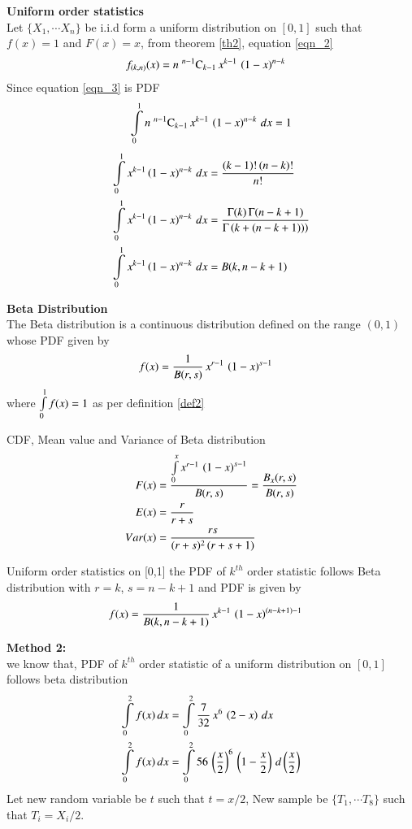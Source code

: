\documentclass[journal,12pt,twocolumn]{IEEEtran}
\begin{document}
\begin{definition}
\textbf{Uniform order statistics} \\
Let $\{X_1,\cdots X_n\}$ be i.i.d form a uniform distribution on $[0,1]$ such that $f(x) = 1$ and $F(x)=x$,
from theorem \eqref{th2}, equation \eqref{eqn_2}
\begin{align}
f_{(k,n)}(x) &= n\;{}^{n-1}\mathrm{C}_{k-1}\,x^{k-1}\,\left(1-x\right)^{n-k}\label{eqn_3}
\end{align}
Since equation \eqref{eqn_3} is PDF 
\begin{equation}
 \int\limits_{0}^{1} n\;{}^{n-1}\mathrm{C}_{k-1}\,x^{k-1}\,\left(1-x\right)^{n-k} \,dx  = 1    
\end{equation}
\begin{align}
\int\limits_{0}^{1} x^{k-1}\left(1-x\right)^{n-k} \,dx  &= \dfrac{(k-1)!\,(n-k)!}{n!}  \\
\int\limits_{0}^{1} x^{k-1}\left(1-x\right)^{n-k} \,dx  &= \dfrac{\Gamma(k)\,\Gamma(n-k+1)}{\Gamma\left(k+(n-k+1))\right)} \\
\int\limits_{0}^{1} x^{k-1}\left(1-x\right)^{n-k} \,dx  &= B(k,n-k+1)
\end{align}
\end{definition}
\newpage
\begin{definition}
\label{bddef}
\textbf{Beta Distribution} \\
The Beta distribution is a continuous distribution defined on the range $(0,1)$ whose PDF given by 
\begin{align}
f(x) &= \dfrac{1}{B(r,s)}\,x^{r-1}\,\left(1-x\right)^{s-1} 
\end{align}
where $\int\limits_{0}^1f(x) = 1$ as per definition \eqref{def2} 

CDF, Mean value and Variance of Beta distribution
\begin{align}
 F(x)   &=\dfrac{\int\limits_{0}^{x}x^{r-1}\,\left(1-x\right)^{s-1}}{B(r,s)} =    \dfrac{B_{x}(r,s)}{B(r,s)} \\
 E(x)   &=   \dfrac{r}{r+s} \\
 Var(x) &= \dfrac{rs}{(r+s)^{2}\,(r+s+1)}
\end{align}
\end{definition}
\begin{lemma}
Uniform order statistics on [0,1] the PDF of $k^{th}$ order statistic follows Beta distribution with $r=k$, $s=n-k+1$ and  PDF is given by 
\begin{align}
f(x) &= \dfrac{1}{B(k,n-k+1)}\,x^{k-1}\,\left(1-x\right)^{(n-k+1)-1} 
\end{align}
\end{lemma}
\textbf{Method 2:}\\
we know that, PDF of $k^{th}$ order statistic of a uniform distribution on $[0,1]$ follows 
beta distribution
\begin{align}
\int\limits_{0}^{2}f(x)\,dx &= \int\limits_{0}^{2} \dfrac{7}{32}\,x^{6}\,\left(2-x\right)\,dx \\
\int\limits_{0}^{2}f(x)\,dx &= \int\limits_{0}^{2} 56\,\left(\dfrac{x}{2}\right)^{6}\,\left(1-\dfrac{x}{2}\right)\,d\left(\dfrac{x}{2}\right)
\end{align}
Let new random variable be $t$ such that $t=x/2$, New sample be $\{T_1,\cdots T_8\}$ such that $T_{i}=X_{i}/2$.
\end{document}
